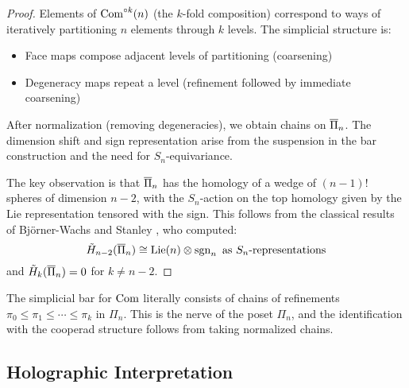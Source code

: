\begin{proof}
Elements of $\operatorname{Com}^{\circ k}(n)$ (the $k$-fold composition) correspond to ways of iteratively partitioning $n$ elements through $k$ levels. The simplicial structure is:
\begin{itemize}
\item Face maps compose adjacent levels of partitioning (coarsening)
\item Degeneracy maps repeat a level (refinement followed by immediate coarsening)
\end{itemize}
 
After normalization (removing degeneracies), we obtain chains on $\overline{\Pi}_n$. The dimension shift and sign representation arise from the suspension in the bar construction and the need for $S_n$-equivariance.
 
The key observation is that $\overline{\Pi}_n$ has the homology of a wedge of $(n-1)!$ spheres of dimension $n-2$, with the $S_n$-action on the top homology given by the Lie representation tensored with the sign. This follows from the classical results of Björner-Wachs \cite{BW93} and Stanley \cite{Sta97}, who computed:
\[
\tilde{H}_{n-2}(\overline{\Pi}_n) \cong \operatorname{Lie}(n) \otimes \operatorname{sgn}_n \text{ as } S_n\text{-representations}
\]
and $\tilde{H}_k(\overline{\Pi}_n) = 0$ for $k \neq n-2$.
\end{proof}
\begin{remark}
The simplicial bar for $\operatorname{Com}$ literally consists of chains of refinements $\pi_0 \leq \pi_1 \leq \cdots \leq \pi_k$ in $\Pi_n$. This is the nerve of the poset $\Pi_n$, and the identification with the cooperad structure follows from taking normalized chains.
\end{remark}
 
\subsection{Holographic Interpretation}

